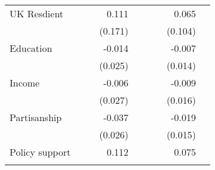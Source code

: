 \documentclass{article}
\begin{document}
\begin{table}[!h]
\begin{tabular}{lllllllll}
\multicolumn{1}{l}{UK Resdient} &
  \multicolumn{1}{r}{} &
  \multicolumn{1}{l}{} &
  \multicolumn{1}{r}{0.111} &
  \multicolumn{1}{l}{} &
  \multicolumn{1}{r}{} &
  \multicolumn{1}{l}{} &
  \multicolumn{1}{r}{0.065} &
  \multicolumn{1}{l}{} \\
\multicolumn{1}{l}{} &
  \multicolumn{1}{r}{} &
  \multicolumn{1}{l}{} &
  \multicolumn{1}{r}{(0.171)} &
  \multicolumn{1}{l}{} &
  \multicolumn{1}{r}{} &
  \multicolumn{1}{l}{} &
  \multicolumn{1}{r}{(0.104)} &
  \multicolumn{1}{l}{} \\
\multicolumn{1}{l}{Education} &
  \multicolumn{1}{r}{} &
  \multicolumn{1}{l}{} &
  \multicolumn{1}{r}{-0.014} &
  \multicolumn{1}{l}{} &
  \multicolumn{1}{r}{} &
  \multicolumn{1}{l}{} &
  \multicolumn{1}{r}{-0.007} &
  \multicolumn{1}{l}{} \\
\multicolumn{1}{l}{} &
  \multicolumn{1}{r}{} &
  \multicolumn{1}{l}{} &
  \multicolumn{1}{r}{(0.025)} &
  \multicolumn{1}{l}{} &
  \multicolumn{1}{r}{} &
  \multicolumn{1}{l}{} &
  \multicolumn{1}{r}{(0.014)} &
  \multicolumn{1}{l}{} \\
\multicolumn{1}{l}{Income} &
  \multicolumn{1}{r}{} &
  \multicolumn{1}{l}{} &
  \multicolumn{1}{r}{-0.006} &
  \multicolumn{1}{l}{} &
  \multicolumn{1}{r}{} &
  \multicolumn{1}{l}{} &
  \multicolumn{1}{r}{-0.009} &
  \multicolumn{1}{l}{} \\
\multicolumn{1}{l}{} &
  \multicolumn{1}{r}{} &
  \multicolumn{1}{l}{} &
  \multicolumn{1}{r}{(0.027)} &
  \multicolumn{1}{l}{} &
  \multicolumn{1}{r}{} &
  \multicolumn{1}{l}{} &
  \multicolumn{1}{r}{(0.016)} &
  \multicolumn{1}{l}{} \\
\multicolumn{1}{l}{Partisanship} &
  \multicolumn{1}{r}{} &
  \multicolumn{1}{l}{} &
  \multicolumn{1}{r}{-0.037} &
  \multicolumn{1}{l}{} &
  \multicolumn{1}{r}{} &
  \multicolumn{1}{l}{} &
  \multicolumn{1}{r}{-0.019} &
  \multicolumn{1}{l}{} \\
\multicolumn{1}{l}{} &
  \multicolumn{1}{r}{} &
  \multicolumn{1}{l}{} &
  \multicolumn{1}{r}{(0.026)} &
  \multicolumn{1}{l}{} &
  \multicolumn{1}{r}{} &
  \multicolumn{1}{l}{} &
  \multicolumn{1}{r}{(0.015)} &
  \multicolumn{1}{l}{} \\
\multicolumn{1}{l}{Policy support} &
  \multicolumn{1}{r}{} &
  \multicolumn{1}{l}{} &
  \multicolumn{1}{r}{0.112} &
  \multicolumn{1}{l}{} &
  \multicolumn{1}{r}{} &
  \multicolumn{1}{l}{} &
  \multicolumn{1}{r}{0.075} &
  \multicolumn{1}{l}{} \\
\multicolumn{1}{l}{} &
  \multicolumn{1}{r}{} &
  \multicolumn{1}{l}{} &

\end{tabular}
\end{table}
\end{document}
